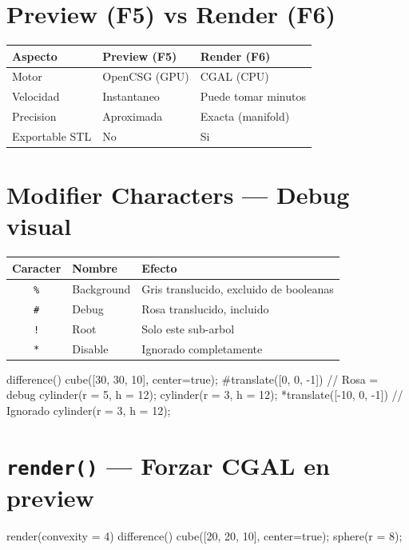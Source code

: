\documentclass[12pt, oneside, a4paper]{report}
\newcommand{\codigo}[1]{\texttt{#1}}
\begin{document}
\section{Preview (F5) vs Render (F6)}
\begin{center}
\begin{tabular}{lll}
\toprule
Aspecto & Preview (F5) & Render (F6) \\
\midrule
Motor & OpenCSG (GPU) & CGAL (CPU) \\
Velocidad & Instantaneo & Puede tomar minutos \\
Precision & Aproximada & Exacta (manifold) \\
Exportable STL & No & Si \\
\bottomrule
\end{tabular}
\end{center}

\section{Modifier Characters --- Debug visual}
\begin{center}
\begin{tabular}{cll}
\toprule
Caracter & Nombre & Efecto \\
\midrule
\codigo{\%} & Background & Gris translucido, excluido de booleanas \\
\codigo{\#} & Debug & Rosa translucido, incluido \\
\codigo{!} & Root & Solo este sub-arbol \\
\codigo{*} & Disable & Ignorado completamente \\
\bottomrule
\end{tabular}
\end{center}

\begin{openscad}
difference() {
    cube([30, 30, 10], center=true);
    #translate([0, 0, -1])          // Rosa = debug
        cylinder(r = 5, h = 12);
        cylinder(r = 3, h = 12);
    *translate([-10, 0, -1])        // Ignorado
        cylinder(r = 3, h = 12);
}
\end{openscad}

\section{\codigo{render()} --- Forzar CGAL en preview}
\begin{openscad}
render(convexity = 4)
    difference() {
        cube([20, 20, 10], center=true);
        sphere(r = 8);
    }
\end{openscad}
\end{document}
